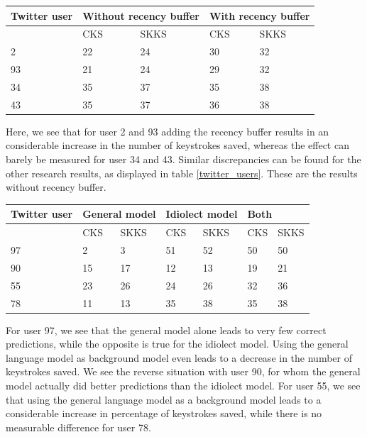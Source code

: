 \documentclass[12pt]{article}
\let\originaltable\table
\let\endoriginaltable\endtable
\renewenvironment{table}[1][ht]{%
  \originaltable[#1]
  \centering}%
  {\endoriginaltable}
\begin{document}
\begin{table}[H] 
\centering
\begin{tabular}{l|llll} 
Twitter user&\multicolumn{2}{l}{Without recency buffer}&\multicolumn{2}{l}{With recency buffer}\\
\hline
&CKS&SKKS&CKS&SKKS\\
2&22&24&30&32\\
93&21&24&29&32\\
34&35&37&35&38\\
43&35&37&36&38\\
\end{tabular} 
\caption{Percentage of keystrokes saved for 4 individual Twitter users, with and without the recency buffer} \label{twitter_users_rb}
\end{table}

Here, we see that for user 2 and 93 adding the recency buffer results in an considerable increase in the number of keystrokes saved, whereas the effect can barely be measured for user 34 and 43. Similar discrepancies can be found for the other research results, as displayed in table \ref{twitter_users}. These are the results without recency buffer.

\begin{table}[H] 
\centering
\begin{tabular}{l|llllll} 
Twitter user&\multicolumn{2}{l}{General model}&\multicolumn{2}{l}{Idiolect model}&\multicolumn{2}{l}{Both}\\
\hline
&CKS&SKKS&CKS&SKKS&CKS&SKKS\\
97&2&3&51&52&50&50\\
90&15&17&12&13&19&21\\
55&23&26&24&26&32&36\\
78&11&13&35&38&35&38\\
\end{tabular} 
\caption{Percentage of keystrokes saved for 4 individual Twitter users, for the idiolect and the general model} \label{twitter_users}
\end{table}

For user 97, we see that the general model alone leads to very few correct predictions, while the opposite is true for the idiolect model. Using the general language model as background model even leads to a decrease in the number of keystrokes saved. We see the reverse situation with user 90, for whom the general model actually did better predictions than the idiolect model. For user 55, we see that using the general language model as a background model leads to a considerable increase in percentage of keystrokes saved, while there is no measurable difference for user 78.
\end{document}
